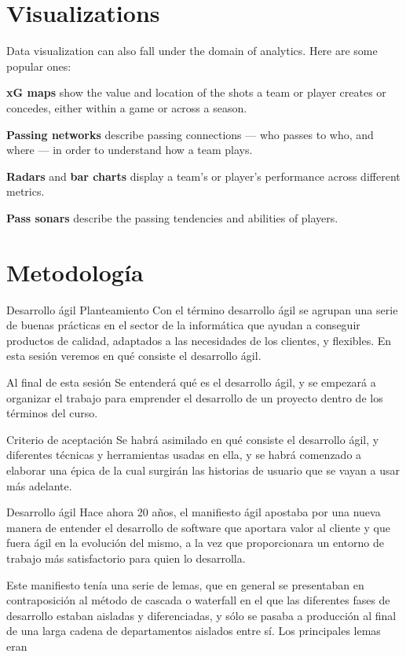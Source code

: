 \section{Visualizations}
Data visualization can also fall under the domain of analytics. Here are some 
popular ones:

\textbf{xG maps} show the value and location of the shots a team or player creates or 
concedes, either within a game or across a season.

\textbf{Passing networks} describe passing connections — who passes to who, 
and where — in order to understand how a team plays.

\textbf{Radars} and \textbf{bar charts} display a team’s or player’s 
performance across different metrics.

\textbf{Pass sonars} describe the passing tendencies and abilities of players.


\section{Metodología}

Desarrollo ágil
Planteamiento
Con el término desarrollo ágil se agrupan una serie de buenas prácticas en el sector de la informática que ayudan a conseguir productos de calidad, adaptados a las necesidades de los clientes, y flexibles. En esta sesión veremos en qué consiste el desarrollo ágil.

Al final de esta sesión
Se entenderá qué es el desarrollo ágil, y se empezará a organizar el trabajo para emprender el desarrollo de un proyecto dentro de los términos del curso.

Criterio de aceptación
Se habrá asimilado en qué consiste el desarrollo ágil, y diferentes técnicas y herramientas usadas en ella, y se habrá comenzado a elaborar una épica de la cual surgirán las historias de usuario que se vayan a usar más adelante.

Desarrollo ágil
Hace ahora 20 años, el manifiesto ágil apostaba por una nueva manera de entender el desarrollo de software que aportara valor al cliente y que fuera ágil en la evolución del mismo, a la vez que proporcionara un entorno de trabajo más satisfactorio para quien lo desarrolla.

Este manifiesto tenía una serie de lemas, que en general se presentaban en contraposición al método de cascada o waterfall en el que las diferentes fases de desarrollo estaban aisladas y diferenciadas, y sólo se pasaba a producción al final de una larga cadena de departamentos aislados entre sí. Los principales lemas eran


